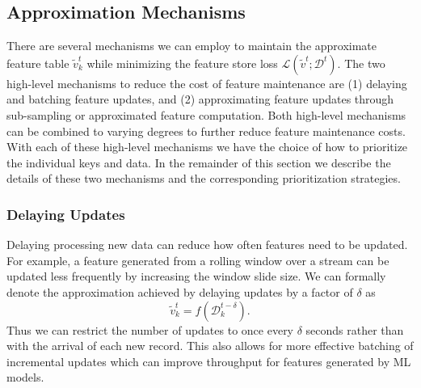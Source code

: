 \subsection{Approximation Mechanisms} \label{sec:mechanisms}
There are several mechanisms we can employ to maintain the approximate feature table $\tilde{v}^t_k$ while minimizing the feature store loss $\mathcal{L}(\tilde{v}^t; \mathcal{D}^t)$. 
The two high-level mechanisms to reduce the cost of feature maintenance are 
(1) delaying and batching feature updates, and 
(2) approximating feature updates through  sub-sampling or approximated feature computation. 
Both high-level mechanisms can be combined to varying degrees to further reduce feature maintenance costs. 
With each of these high-level mechanisms we have the choice of how to prioritize the individual keys and data. 
In the remainder of this section we describe the details of these two mechanisms and the corresponding prioritization strategies.

 \subsubsection{Delaying Updates} 

Delaying processing new data can reduce how often features need to be updated. 
For example, a feature generated from a rolling window over a stream can be updated less frequently by increasing the window slide size. 
We can formally denote the approximation achieved by delaying updates by a factor of  $\delta$ as
\begin{equation}
    \tilde{v}^t_k = f\left( \mathcal{D}^{t-\delta}_k\right).\label{eqn:delayedupdate}
\end{equation}
Thus we can restrict the number of updates to once every $\delta$ seconds rather than with the arrival of each new record.
This also allows for more effective batching of incremental updates which can improve throughput for features generated by ML models. 


